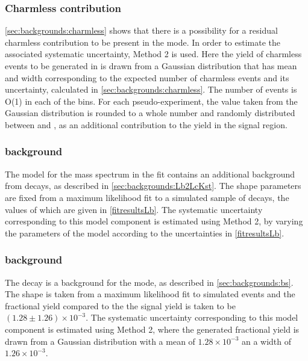 \subsubsection{Charmless contribution}

\Sect\ref{sec:backgrounds:charmless} shows that there is a possibility for a residual charmless contribution to be present in the \pipi mode. In order to estimate the associated systematic uncertainty, Method 2 is used. Here the yield of charmless events to be generated in \pipi is drawn from a Gaussian distribution that has mean and width corresponding to the expected number of charmless events and its uncertainty, calculated in \sect\ref{sec:backgrounds:charmless}. The number of events is O(1) in each of the bins. For each pseudo-experiment, the value taken from the Gaussian distribution is rounded to a whole number and randomly distributed between \Bp and \Bm, as an additional contribution to the yield in the signal region. 

\subsubsection{\boldmath {} background}

The model for the \kk mass spectrum in the \CP fit contains an additional background from  decays, as described in \sect\ref{sec:backgrounds:Lb2LcKst}. The shape parameters are fixed from a maximum likelihood fit to a simulated sample of  decays, the values of which are given in \tab\ref{fitresultsLb}. The systematic uncertainty corresponding to this model component is estimated using Method 2, by varying the parameters of the model according to the uncertainties in \tab\ref{fitresultsLb}.

\subsubsection{\boldmath {} background}

The decay  is a background for the \pik mode, as described in \sect\ref{sec:backgrounds:bs}. The shape is taken from a maximum likelihood fit to simulated events and the fractional yield compared to the the \pik signal yield is taken to be $(1.28 \pm 1.26) \times 10^{-3}$. The systematic uncertainty corresponding to this model component is estimated using Method 2, where the generated fractional yield is drawn from a Gaussian distribution with a mean of $1.28 \times 10^{-3}$ an a width of $1.26 \times 10^{-3}$.

